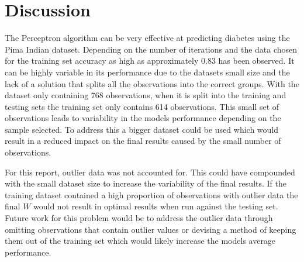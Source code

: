 \documentclass[10pt,twocolumn,letterpaper]{article}
\begin{document}
\section{Discussion}
The Perceptron algorithm can be very effective at predicting diabetes using the Pima Indian dataset. Depending
on the number of iterations and the data chosen for the training set accuracy as high as  approximately 0.83
has been observed. It can be highly variable in its performance due to the datasets small size and the lack
of a solution that splits all the observations into the correct groups. With the dataset only containing 768
observations, when it is split into the training and testing sets the training set only contains 614 observations.
This small set of observations leads to variability in the models performance depending on the sample selected.
To address this a bigger dataset could be used which would result in a reduced impact on the final results
caused by the small number of observations.

For this report, outlier data was not accounted for. This could have compounded with the small dataset size
to increase the variability of the final results. If the training dataset contained a high proportion of
observations with outlier data the final $W$ would not result in optimal results when run against the testing
set. Future work for this problem would be to address the outlier data through omitting observations that
contain outlier values or devising a method of keeping them out of the training set which would likely
increase the models average performance.


\small


\end{document}
